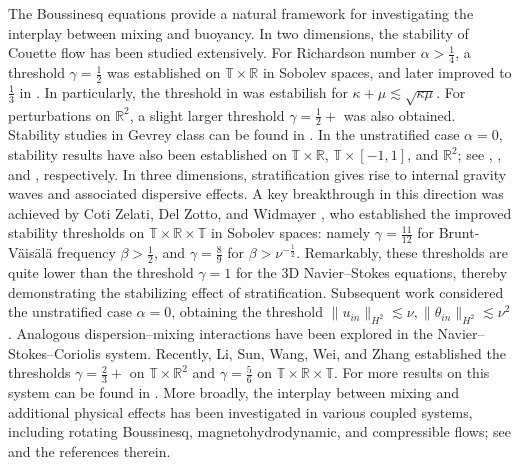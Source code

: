 \documentclass[12pt]{article}
\numberwithin{equation}{section}
\begin{document}
	The Boussinesq equations provide a natural framework for investigating the interplay between mixing and buoyancy. In two dimensions, the stability of Couette flow has been studied extensively. For Richardson number $\alpha>\frac{1}{4}$, a threshold $\gamma=\frac{1}{2}$ \cite{ZZ23} was established on $\mathbb{T}\times\mathbb{R}$ in Sobolev spaces, and later improved to $\frac{1}{3}$ in \cite{RW26,K25}. In particularly, the threshold in \cite{RW26} was estabilish for $\kappa+\mu\lesssim\sqrt{\kappa\mu}$. For perturbations on $\mathbb{R}^2$, a slight larger threshold $\gamma=\frac{1}{2}+$ \cite{A25} was also obtained. Stability studies in Gevrey class can be found in \cite{MSZ22,BBCD2023}. In the unstratified case $\alpha=0$, stability results have also been established on $\mathbb{T}\times\mathbb{R}$, $\mathbb{T}\times[-1,1]$, and $\mathbb{R}^2$; see \cite{DWZ21,NZ24,ZZi23}, \cite{MZZ23,LWZ25}, and \cite{CWY25}, respectively. In three dimensions, stratification gives rise to internal gravity waves and associated dispersive effects. A key breakthrough in this direction was achieved by Coti Zelati, Del Zotto, and Widmayer \cite{CD23,CDW24}, who established the improved stability thresholds on $\mathbb{T}\times\mathbb{R}\times\mathbb{T}$ in Sobolev spaces: namely $\gamma=\frac{11}{12}$ for Brunt-V\"ais\"al\"a frequency $\beta>\frac{1}{2}$, and $\gamma=\frac{8}{9}$ for $\beta>\nu^{-\frac{1}{2}}$. 
	Remarkably, these thresholds are quite lower than the threshold $\gamma=1$ for the 3D Navier--Stokes equations, thereby demonstrating the stabilizing effect of stratification.	Subsequent work \cite{CWW25} considered the unstratified case $\alpha=0$, obtaining the threshold $\|u_{in}\|_{H^2}\lesssim\nu, \|\theta_{in}\|_{H^2}\lesssim\nu^2$. Analogous dispersion--mixing interactions have been explored in the Navier--Stokes--Coriolis system. Recently, Li, Sun, Wang, Wei, and Zhang \cite{LSWZ25} established the thresholds $\gamma=\frac{2}{3}+$ on $\mathbb{T}\times\mathbb{R}^2$ and $\gamma=\frac{5}{6}$ on $\mathbb{T}\times\mathbb{R}\times\mathbb{T}$.
	For more results on this system can be found in \cite{HSX24a,CDW25}. More broadly, the interplay between mixing and additional physical effects has been investigated in various coupled systems, including rotating Boussinesq, magnetohydrodynamic, and compressible flows; see \cite{HLSX26,L20,K25,HLX26,LWZ25} and the references therein.
	
\end{document}
